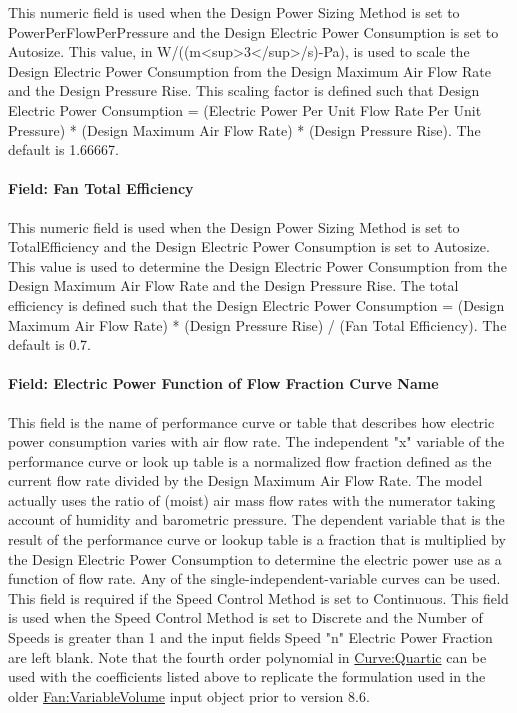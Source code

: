 This numeric field is used when the Design Power Sizing Method is set to PowerPerFlowPerPressure and the Design Electric Power Consumption is set to Autosize.  This value, in W/((m<sup>3</sup>/s)-Pa), is used to scale the Design Electric Power Consumption from the Design Maximum Air Flow Rate and the Design Pressure Rise.  This scaling factor is defined such that Design Electric Power Consumption = (Electric Power Per Unit Flow Rate Per Unit Pressure) * (Design Maximum Air Flow Rate) * (Design Pressure Rise).  The default is 1.66667.

\paragraph{Field: Fan Total Efficiency}\label{field-total-efficiency-fansysmodel}

This numeric field is used when the Design Power Sizing Method is set to TotalEfficiency and the Design Electric Power Consumption is set to Autosize.  This value is used to determine the Design Electric Power Consumption from the Design Maximum Air Flow Rate and the Design Pressure Rise.  The total efficiency is defined such that the Design Electric Power Consumption = (Design Maximum Air Flow Rate) * (Design Pressure Rise) / (Fan Total Efficiency).  The default is 0.7.

\paragraph{Field: Electric Power Function of Flow Fraction Curve Name}\label{field-power-curve-name-fansysmodel}

This field is the name of performance curve or table that describes how electric power consumption varies with air flow rate.  The independent "x" variable of the performance curve or look up table is a normalized flow fraction defined as the current flow rate divided by the Design Maximum Air Flow Rate.  The model actually uses the ratio of (moist) air mass flow rates with the numerator taking account of humidity and barometric pressure.  The dependent variable that is the result of the performance curve or lookup table is a fraction that is multiplied by the Design Electric Power Consumption to determine the electric power use as a function of flow rate.  Any of the single-independent-variable curves can be used.  This field is required if the Speed Control Method is set to Continuous.  This field is used when the Speed Control Method is set to Discrete and the Number of Speeds is greater than 1 and the input fields Speed "n" Electric Power Fraction are left blank.  Note that the fourth order polynomial in \hyperref[curvequartic]{Curve:Quartic} can be used with the coefficients listed above to replicate the formulation used in the older \hyperref[fanvariablevolume]{Fan:VariableVolume} input object prior to version 8.6.

